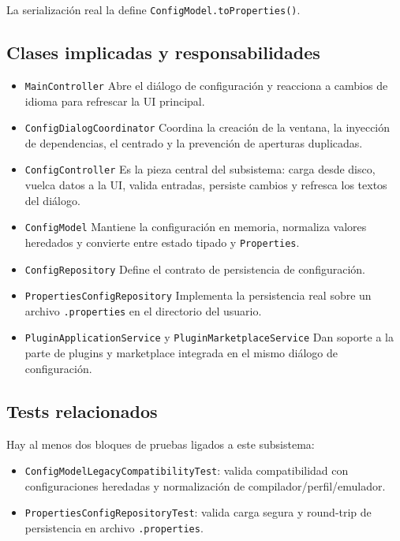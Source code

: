 \documentclass[../../main.tex]{subfiles}
\begin{document}
La serialización real la define \lstinline|ConfigModel.toProperties()|.

\clearpage

\subsection{Clases implicadas y responsabilidades}

\begin{itemize}
    \item \lstinline|MainController| Abre el diálogo de configuración y reacciona a cambios de idioma para refrescar la UI principal.
    \item \lstinline|ConfigDialogCoordinator| Coordina la creación de la ventana, la inyección de dependencias, el centrado y la prevención de aperturas duplicadas.
    \item \lstinline|ConfigController| Es la pieza central del subsistema: carga desde disco, vuelca datos a la UI, valida entradas, persiste cambios y refresca los textos del diálogo.
    \item \lstinline|ConfigModel| Mantiene la configuración en memoria, normaliza valores heredados y convierte entre estado tipado y \lstinline|Properties|.
    \item \lstinline|ConfigRepository| Define el contrato de persistencia de configuración.
    \item \lstinline|PropertiesConfigRepository| Implementa la persistencia real sobre un archivo \lstinline|.properties| en el directorio del usuario.
    \item \lstinline|PluginApplicationService| y \lstinline|PluginMarketplaceService| Dan soporte a la parte de plugins y marketplace integrada en el mismo diálogo de configuración.
\end{itemize}

\subsection{Tests relacionados}

Hay al menos dos bloques de pruebas ligados a este subsistema:

\begin{itemize}
    \item \lstinline|ConfigModelLegacyCompatibilityTest|: valida compatibilidad con configuraciones heredadas y normalización de compilador/perfil/emulador.
    \item \lstinline|PropertiesConfigRepositoryTest|: valida carga segura y round-trip de persistencia en archivo \lstinline|.properties|.
\end{itemize}
\end{document}
